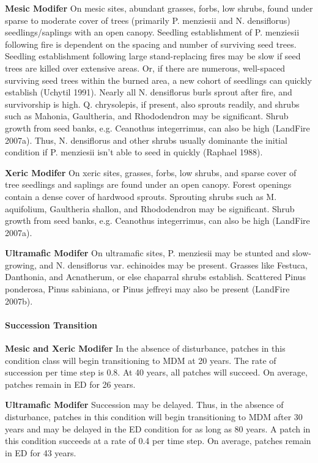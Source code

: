 \begin{adjustwidth}{2cm}{}
\textbf{Mesic Modifer } On mesic sites, abundant grasses, forbs, low shrubs, found under sparse to moderate cover of trees (primarily P. menziesii and N. densiflorus) seedlings/saplings with an open canopy. Seedling establishment of P. menziesii following fire is dependent on the spacing and number of surviving seed trees. Seedling establishment following large stand-replacing fires may be slow if seed trees are killed over extensive areas. Or, if there are numerous, well-spaced surviving seed trees within the burned area, a new cohort of seedlings can quickly establish (Uchytil 1991). Nearly all N. densiflorus burls sprout after fire, and survivorship is high. Q. chrysolepis, if present, also sprouts readily, and shrubs such as Mahonia, Gaultheria, and Rhododendron may be significant. Shrub growth from seed banks, e.g. Ceanothus integerrimus, can also be high (LandFire 2007a). Thus, N. densiflorus and other shrubs usually dominante the initial condition if P. menziesii isn’t able to seed in quickly (Raphael 1988).

\medskip
\noindent \textbf{Xeric Modifer}  On xeric sites, grasses, forbs, low shrubs, and sparse cover of tree seedlings and saplings are found under an open canopy. Forest openings contain a dense cover of hardwood sprouts. Sprouting shrubs such as M. aquifolium, Gaultheria shallon, and Rhododendron may be significant. Shrub growth from seed banks, e.g. Ceanothus integerrimus, can also be high (LandFire 2007a). 


\medskip
\noindent \textbf{Ultramafic Modifer}  On ultramafic sites, P. menziesii may be stunted and slow-growing, and N. densiflorus var. echinoides may be present. Grasses like Festuca, Danthonia, and Acnatherum, or else chaparral shrubs establish. Scattered Pinus ponderosa, Pinus sabiniana, or Pinus jeffreyi may also be present (LandFire 2007b).

\end{adjustwidth}

\paragraph{Succession Transition}
\begin{adjustwidth}{2cm}{}
\textbf{Mesic and Xeric Modifer } In the absence of disturbance, patches in this condition class will begin transitioning to MDM at 20 years. The rate of succession per time step is 0.8. At 40 years, all patches will succeed. On average, patches remain in ED for 26 years.


\medskip
\noindent \textbf{Ultramafic Modifer} Succession may be delayed. Thus, in the absence of disturbance, patches in this condition will begin transitioning to MDM after 30 years and may be delayed in the ED condition for as long as 80 years. A patch in this condition succeeds at a rate of 0.4 per time step. On average, patches remain in ED for 43 years.

\end{adjustwidth}

